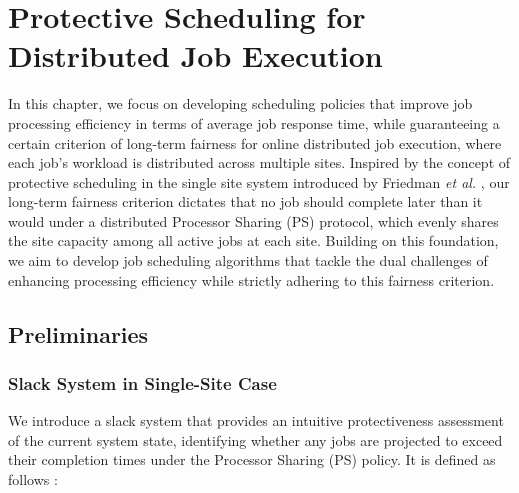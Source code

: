 \chapter{Protective Scheduling for Distributed Job Execution}
\label{ch:PFSP}
In this chapter, we focus on developing scheduling policies that improve job processing efficiency in terms of average job response time, while guaranteeing a certain criterion of long-term fairness for online distributed job execution, where each job's workload is distributed across multiple sites. Inspired by the concept of protective scheduling in the single site system introduced by Friedman \textit{et al.} \cite{friedman2003fairness, friedman2003protective}, our long-term fairness criterion dictates that no job should complete later than it would under a distributed Processor Sharing (PS) protocol, which evenly shares the site capacity among all active jobs at each site. Building on this foundation, we aim to develop job scheduling algorithms that tackle the dual challenges of enhancing processing efficiency while strictly adhering to this fairness criterion.


\section{Preliminaries}
\label{sec:prelim}
\subsection{Slack System in Single-Site Case}
\label{sec:pre_slack}

We introduce a slack system that provides an intuitive protectiveness assessment of the current system state, identifying whether any jobs are projected to exceed their completion times under the Processor Sharing (PS) policy. It is defined as follows \cite{friedman2003protective}:

